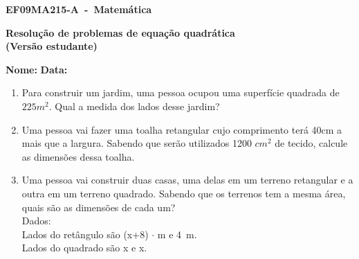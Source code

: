 \documentclass[a4paper,14pt]{article}
\begin{document}
	
	\noindent\textbf{EF09MA215-A~-~Matemática} 
	
	\begin{center}
		\textbf{Resolução de problemas de equação quadrática \\(Versão estudante)}
	\end{center}
	
	\bigskip
	
	\noindent\textbf{Nome:} \underline{\hspace{10cm}}
	\noindent\textbf{Data:} \underline{\hspace{4cm}}
	
	\bigskip
	\begin{enumerate}
	\item Para construir um jardim, uma pessoa ocupou uma superfície quadrada de $225 m^2$. Qual a medida dos lados desse jardim?
	\vspace{8cm}
	
	\item Uma pessoa vai fazer uma toalha retangular cujo comprimento terá 40cm a mais que a largura. Sabendo que serão utilizados 1200 $cm^2$ de tecido, calcule as dimensões dessa toalha.
	\vspace{10cm}
	
	\item Uma pessoa vai construir duas casas, uma delas em um terreno retangular e a outra em um terreno quadrado. Sabendo que os terrenos tem a mesma área, quais são as dimensões de cada um? \\
	Dados:  \\ 
	Lados do retângulo são (x+8) $\cdot$ m e 4~m. \\ Lados do quadrado são x e x.
	\vspace{10cm}
	\end{enumerate}
\end{document}
